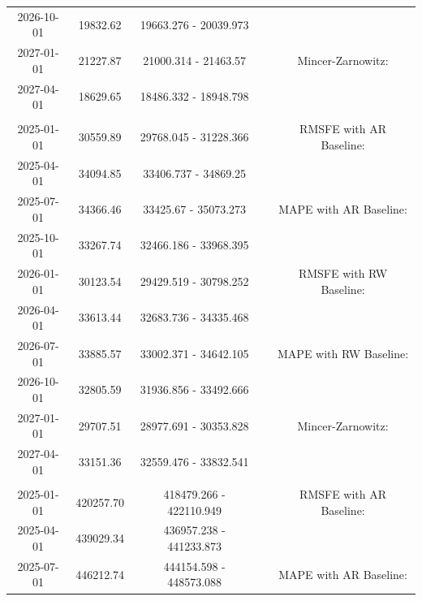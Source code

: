 \begin{table}
\begin{tabular}[t]{ccccc}
\hspace{1em}2026-10-01 & 19832.62 & 19663.276 - 20039.973 &  & \\
\hspace{1em}2027-01-01 & 21227.87 & 21000.314 - 21463.57 &  & Mincer-Zarnowitz:\\
\hspace{1em}2027-04-01 & 18629.65 & 18486.332 - 18948.798 &  & \\
\addlinespace[0.3em]
\multicolumn{5}{l}{\textbf{EmiCO2RoaTra}}\\
\hspace{1em}2025-01-01 & 30559.89 & 29768.045 - 31228.366 &  & RMSFE with AR Baseline:\\
\hspace{1em}2025-04-01 & 34094.85 & 33406.737 - 34869.25 &  & \\
\hspace{1em}2025-07-01 & 34366.46 & 33425.67 - 35073.273 &  & MAPE with AR Baseline:\\
\hspace{1em}2025-10-01 & 33267.74 & 32466.186 - 33968.395 &  & \\
\hspace{1em}2026-01-01 & 30123.54 & 29429.519 - 30798.252 &  & RMSFE with RW Baseline:\\
\hspace{1em}2026-04-01 & 33613.44 & 32683.736 - 34335.468 &  & \\
\hspace{1em}2026-07-01 & 33885.57 & 33002.371 - 34642.105 &  & MAPE with RW Baseline:\\
\hspace{1em}2026-10-01 & 32805.59 & 31936.856 - 33492.666 &  & \\
\hspace{1em}2027-01-01 & 29707.51 & 28977.691 - 30353.828 &  & Mincer-Zarnowitz:\\
\hspace{1em}2027-04-01 & 33151.36 & 32559.476 - 33832.541 &  & \\
\addlinespace[0.3em]
\multicolumn{5}{l}{\textbf{RealConsHH}}\\
\hspace{1em}2025-01-01 & 420257.70 & 418479.266 - 422110.949 &  & RMSFE with AR Baseline:\\
\hspace{1em}2025-04-01 & 439029.34 & 436957.238 - 441233.873 &  & \\
\hspace{1em}2025-07-01 & 446212.74 & 444154.598 - 448573.088 &  & MAPE with AR Baseline:\\

\end{tabular}
\end{table}
